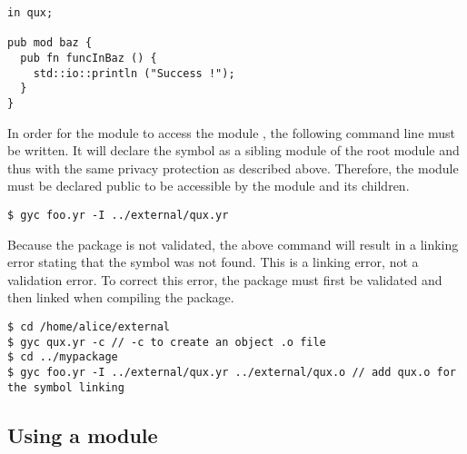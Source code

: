 \begin{lstlisting}[caption=\textit{/home/alice/external/qux.yr}, style=coloredverbatim]
in qux;

pub mod baz {
  pub fn funcInBaz () {
    std::io::println ("Success !");
  }
}
\end{lstlisting}

In order for the module  to access the module
, the following command line must be written. It will declare
the symbol  as a sibling module of the root module  and
thus with the same privacy protection as described above. Therefore, the module
 must be declared public to be accessible by the module
 and its children.

\begin{lstlisting}[style=intermediateVerb]
$ gyc foo.yr -I ../external/qux.yr
\end{lstlisting}

Because the  package is not validated, the above command will result
in a linking error stating that the symbol  was not
found. This is a linking error, not a validation error. To correct this error,
the  package must first be validated and then linked when compiling
the  package.

\begin{minipage}{\linewidth}
\begin{lstlisting}[style=intermediateVerb]
$ cd /home/alice/external
$ gyc qux.yr -c // -c to create an object .o file
$ cd ../mypackage
$ gyc foo.yr -I ../external/qux.yr ../external/qux.o // add qux.o for the symbol linking
\end{lstlisting}
\end{minipage}


\subsection {Using a module}

